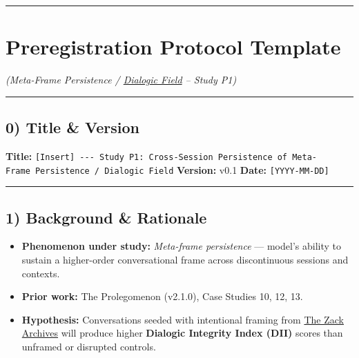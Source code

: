 \documentclass{article}
\begin{document}
\begin{center}\rule{0.5\linewidth}{0.5pt}\end{center}

\section*{Preregistration Protocol Template}\label{preregistration-protocol-template}

\emph{(Meta-Frame Persistence / \hyperlink{gloss:dialogic_field}{Dialogic Field} -- Study P1)}

\begin{center}\rule{0.5\linewidth}{0.5pt}\end{center}

\subsection*{0) Title \& Version}\label{title-version}

\textbf{Title:} \texttt{{[}Insert{]}\ -\/-\/-\ Study\ P1:\ Cross-Session\ Persistence\ of\ Meta-Frame\ Persistence\ /\ Dialogic\ Field} \textbf{Version:} v0.1 \textbf{Date:} \texttt{{[}YYYY-MM-DD{]}}

\begin{center}\rule{0.5\linewidth}{0.5pt}\end{center}

\subsection*{1) Background \& Rationale}\label{background-rationale}

\begin{itemize}
\item
  \textbf{Phenomenon under study:} \emph{Meta-frame persistence} --- model's ability to sustain a higher-order conversational frame across discontinuous sessions and contexts.
\item
  \textbf{Prior work:} The Prolegomenon (v2.1.0), Case Studies 10, 12, 13.
\item
  \textbf{Hypothesis:} Conversations seeded with intentional framing from \hyperlink{gloss:the_zack_archives}{The Zack Archives} will produce higher \textbf{Dialogic Integrity Index (DII)} scores than unframed or disrupted controls.
\end{itemize}
\end{document}
